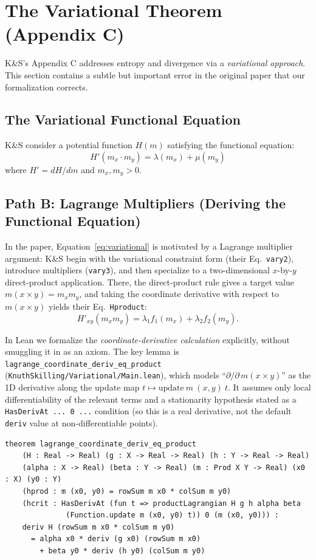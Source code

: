 \documentclass[11pt]{article}
\theoremstyle{definition}
\theoremstyle{remark}
\begin{document}
\section{The Variational Theorem (Appendix C)}
\label{sec:variational}

K\&S's Appendix C addresses entropy and divergence via a \emph{variational approach}.
This section contains a subtle but important error in the original paper that our formalization corrects.

\subsection{The Variational Functional Equation}

K\&S consider a potential function $H(m)$ satisfying the functional equation:
\begin{equation}
H'(m_x \cdot m_y) = \lambda(m_x) + \mu(m_y) \label{eq:variational}
\end{equation}
where $H' = dH/dm$ and $m_x, m_y > 0$.

\subsection{Path B: Lagrange Multipliers (Deriving the Functional Equation)}

In the paper, Equation~\eqref{eq:variational} is motivated by a Lagrange multiplier argument:
K\&S begin with the variational constraint form (their Eq.~\texttt{vary2}), introduce multipliers
(\texttt{vary3}), and then specialize to a two-dimensional $x$-by-$y$ direct-product application.
There, the direct-product rule gives a target value $m(x\times y)=m_x m_y$, and taking the
coordinate derivative with respect to $m(x\times y)$ yields their Eq.~\texttt{Hproduct}:
\[
H'_{xy}(m_x m_y) = \lambda_1 f_1(m_x) + \lambda_2 f_2(m_y).
\]

In Lean we formalize the \emph{coordinate-derivative calculation} explicitly, without smuggling it in
as an axiom.  The key lemma is
\texttt{lagrange\_coordinate\_deriv\_eq\_product}
(\texttt{KnuthSkilling/Variational/Main.lean}), which models
``$\partial/\partial\,m(x\times y)$'' as the 1D derivative along the update map
$t \mapsto \mathrm{update}\ m\ (x,y)\ t$.
It assumes only local differentiability of the relevant terms and a stationarity hypothesis stated as a
\texttt{HasDerivAt ... 0 ...} condition (so this is a real derivative, not the default \texttt{deriv} value at non-differentiable points).

\begin{lstlisting}[caption={Path B: coordinate-derivative separation at a stationary point}]
theorem lagrange_coordinate_deriv_eq_product
    (H : Real -> Real) (g : X -> Real -> Real) (h : Y -> Real -> Real)
    (alpha : X -> Real) (beta : Y -> Real) (m : Prod X Y -> Real) (x0 : X) (y0 : Y)
    (hprod : m (x0, y0) = rowSum m x0 * colSum m y0)
    (hcrit : HasDerivAt (fun t => productLagrangian H g h alpha beta
              (Function.update m (x0, y0) t)) 0 (m (x0, y0))) :
    deriv H (rowSum m x0 * colSum m y0)
      = alpha x0 * deriv (g x0) (rowSum m x0)
        + beta y0 * deriv (h y0) (colSum m y0)
\end{lstlisting}
\end{document}
